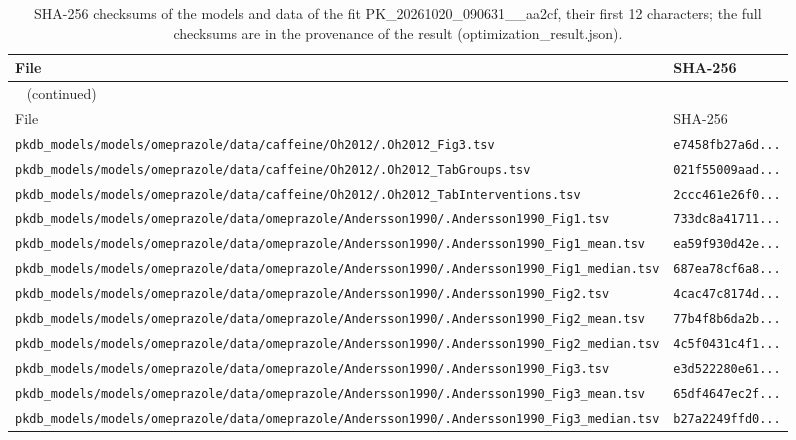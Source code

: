 \documentclass{article}
\begin{document}
\begin{longtable}{ll}
\caption{SHA-256 checksums of the models and data of the fit PK\_20261020\_090631\_\_aa2cf, their first 12 characters; the full checksums are in the provenance of the result (optimization\_result.json).}\label{tab:checksums:PK_20261020_090631__aa2cf} \\
\toprule
File & SHA-256 \\
\midrule
\endfirsthead
\multicolumn{2}{l}{\small\tablename~\thetable{} (continued)} \\
\toprule
File & SHA-256 \\
\midrule
\endhead
\bottomrule
\endlastfoot
\texttt{pkdb\_models/models/omeprazole/data/caffeine/Oh2012/.Oh2012\_Fig3.tsv} & \texttt{e7458fb27a6d...} \\
\texttt{pkdb\_models/models/omeprazole/data/caffeine/Oh2012/.Oh2012\_TabGroups.tsv} & \texttt{021f55009aad...} \\
\texttt{pkdb\_models/models/omeprazole/data/caffeine/Oh2012/.Oh2012\_TabInterventions.tsv} & \texttt{2ccc461e26f0...} \\
\texttt{pkdb\_models/models/omeprazole/data/omeprazole/Andersson1990/.Andersson1990\_Fig1.tsv} & \texttt{733dc8a41711...} \\
\texttt{pkdb\_models/models/omeprazole/data/omeprazole/Andersson1990/.Andersson1990\_Fig1\_mean.tsv} & \texttt{ea59f930d42e...} \\
\texttt{pkdb\_models/models/omeprazole/data/omeprazole/Andersson1990/.Andersson1990\_Fig1\_median.tsv} & \texttt{687ea78cf6a8...} \\
\texttt{pkdb\_models/models/omeprazole/data/omeprazole/Andersson1990/.Andersson1990\_Fig2.tsv} & \texttt{4cac47c8174d...} \\
\texttt{pkdb\_models/models/omeprazole/data/omeprazole/Andersson1990/.Andersson1990\_Fig2\_mean.tsv} & \texttt{77b4f8b6da2b...} \\
\texttt{pkdb\_models/models/omeprazole/data/omeprazole/Andersson1990/.Andersson1990\_Fig2\_median.tsv} & \texttt{4c5f0431c4f1...} \\
\texttt{pkdb\_models/models/omeprazole/data/omeprazole/Andersson1990/.Andersson1990\_Fig3.tsv} & \texttt{e3d522280e61...} \\
\texttt{pkdb\_models/models/omeprazole/data/omeprazole/Andersson1990/.Andersson1990\_Fig3\_mean.tsv} & \texttt{65df4647ec2f...} \\
\texttt{pkdb\_models/models/omeprazole/data/omeprazole/Andersson1990/.Andersson1990\_Fig3\_median.tsv} & \texttt{b27a2249ffd0...} \\

\end{longtable}
\end{document}
